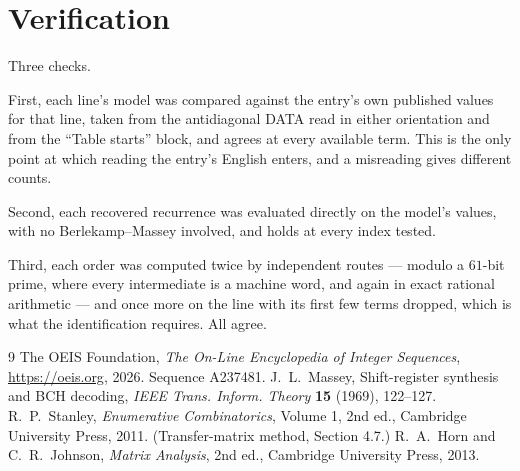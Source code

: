 \documentclass[11pt,a4paper]{article}
\theoremstyle{plain}
\theoremstyle{definition}
\begin{document}
\section{Verification}

Three checks.

First, each line's model was compared against the entry's own published values for that line,
taken from the antidiagonal DATA read in either orientation and from the ``Table starts''
block, and agrees at every available term. This is the only point at which reading the entry's
English enters, and a misreading gives different counts.

Second, each recovered recurrence was evaluated directly on the model's values, with no
Berlekamp--Massey involved, and holds at every index tested.

Third, each order was computed twice by independent routes --- modulo a $61$-bit prime, where
every intermediate is a machine word, and again in exact rational arithmetic --- and once more
on the line with its first few terms dropped, which is what the identification requires. All
agree.

\begin{thebibliography}{9}
 The OEIS Foundation, \emph{The On-Line Encyclopedia of Integer
Sequences}, \url{https://oeis.org}, 2026. Sequence A237481.
 J.~L.~Massey, Shift-register synthesis and BCH decoding, \emph{IEEE
Trans. Inform. Theory} \textbf{15} (1969), 122--127.
 R.~P.~Stanley, \emph{Enumerative Combinatorics}, Volume 1, 2nd ed.,
Cambridge University Press, 2011. (Transfer-matrix method, Section 4.7.)
 R.~A.~Horn and C.~R.~Johnson, \emph{Matrix Analysis}, 2nd ed., Cambridge
University Press, 2013.
\end{thebibliography}
\end{document}
